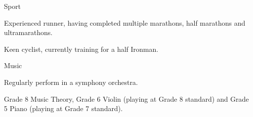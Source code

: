 \begin{cventries}

\cventry
    {Sport}
    {}
    {}
    {}
    {
      \begin{cvitems}
      \item {Experienced runner, having completed multiple marathons, half marathons and ultramarathons.}
        \item {Keen cyclist, currently training for a half Ironman.}
      \end{cvitems}
    }
  \cventry
    {Music}
    {}
    {}
    {}
    {
      \begin{cvitems}
      \item{Regularly perform in a symphony orchestra.}
      \item{Grade 8 Music Theory, Grade 6 Violin (playing at Grade 8 standard) and Grade 5 Piano (playing at Grade 7 standard).}
      \end{cvitems}
    }
\end{cventries}
